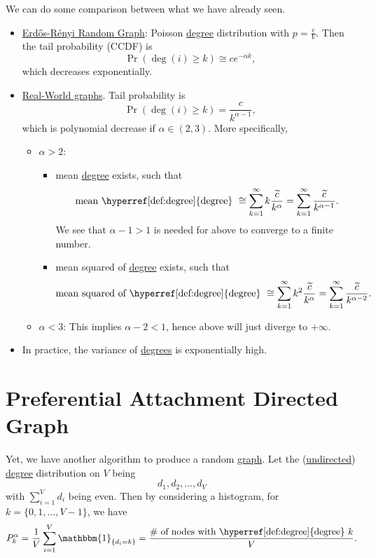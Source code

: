 \begin{remark}
	We can do some comparison between what we have already seen.
	\begin{itemize}
		\item \hyperref[sec:Erdos-Renyi-random-graphs-family]{Erdős-Rényi Random Graph}:
		      Poisson \hyperref[def:degree]{degree} distribution with \(p = \frac{c}{V}\). Then the tail probability (CCDF) is
		      \[
			      \Pr(\deg (i)\geq k)\cong c e^{-\alpha k},
		      \]
		      which decreases exponentially.
		\item \hyperref[sec:real-world-graphs]{Real-World graphs}. Tail probability is
		      \[
			      \Pr(\deg(i) \geq k) = \frac{c}{k^{\alpha - 1}},
		      \]
		      which is polynomial decrease if \(\alpha\in(2, 3)\). More specifically,
		      \begin{itemize}
			      \item \(\alpha>2\):
			            \begin{itemize}
				            \item mean \hyperref[def:degree]{degree} exists, such that
				                  \[
					                  \text{mean \hyperref[def:degree]{degree} }\cong \sum\limits_{k=1}^{\infty} k \frac{\widetilde{c}}{k^{\alpha}} = \sum\limits_{k=1}^{\infty} \frac{\widetilde{c}}{k^{\alpha - 1}}.
				                  \]
				                  We see that \(\alpha - 1 > 1\) is needed for above to converge to a finite number.
				            \item mean squared of \hyperref[def:degree]{degree} exists, such that
				                  \[
					                  \text{mean squared of \hyperref[def:degree]{degree} }\cong \sum\limits_{k=1}^{\infty} k^2 \frac{\widetilde{c}}{k^{\alpha}} = \sum\limits_{k=1}^{\infty} \frac{\widetilde{c}}{k^{\alpha-2}}.
				                  \]
			            \end{itemize}
			      \item \(\alpha<3\): This implies \(\alpha - 2 < 1\), hence above will just diverge to \(+\infty\).
		      \end{itemize}
		\item In practice, the variance of \hyperref[def:degree]{degrees} is exponentially high.
	\end{itemize}
\end{remark}

\section{Preferential Attachment Directed Graph}
Yet, we have another algorithm to produce a random \hyperref[def:graph]{graph}. Let the (\hyperref[def:undirected-graph]{undirected}) \hyperref[def:degree]{degree}
distribution on \(V\) being
\[
	d_1, d_2, \ldots , d_V
\]
with \(\sum\limits_{i=1}^{V} d_i\) being even. Then by considering a histogram, for \(k = \{0, 1, \ldots , V - 1\}\), we have
\[
	P_k^{\alpha} = \frac{1}{V}\sum\limits_{i=1}^{V} \mathbbm{1}_{\{d_i = k\}} = \frac{\#\text{ of nodes with \hyperref[def:degree]{degree} }k}{V}.
\]

